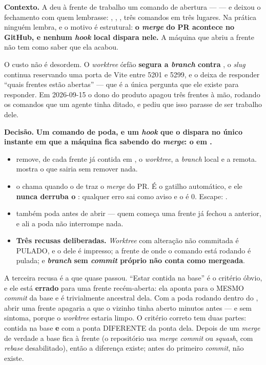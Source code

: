 \textbf{Contexto.} A  deu à frente de trabalho um comando de
abertura ---  --- e deixou o fechamento com quem
lembrasse: , , , três comandos em três lugares. Na prática ninguém lembra, e o motivo
é estrutural: \textbf{o \emph{merge} do PR acontece no GitHub, e nenhum
\emph{hook} local dispara nele.} A máquina que abriu a frente não tem como saber que ela
acabou.

O custo não é desordem. O \emph{worktree} órfão \textbf{segura a \emph{branch}
contra }, o \emph{slug} continua reservando uma porta de Vite entre
5201 e 5299, e o  deixa de responder \enquote{quais
frentes estão abertas} --- que é a única pergunta que ele existe para responder.
Em 2026-09-15 o dono do produto apagou três frentes à mão, rodando os comandos
que um agente tinha ditado, e pediu que isso parasse de ser trabalho dele.

\textbf{Decisão.} \textbf{Um comando de poda, e um \emph{hook} que o dispara no
único instante em que a máquina fica sabendo do \emph{merge}: o 
em .}

\begin{itemize}
  \item {} remove, de cada frente já contida em
    , o \emph{worktree}, a \emph{branch} local e a remota.
     mostra o que sairia sem remover nada.
  \item {} o chama quando o  de
     traz o \emph{merge} do PR. É o gatilho automático, e ele
    \textbf{nunca derruba o }: qualquer erro sai como aviso e o
     é 0. Escape: .
  \item {} também poda antes de abrir --- quem começa uma
    frente já fechou a anterior, e ali a poda não interrompe nada.
  \item \textbf{Três recusas deliberadas.} \emph{Worktree} com alteração não
    commitada é PULADO, e o  dele é impresso; a frente de onde o
    comando está rodando é pulada; e \textbf{\emph{branch} sem \emph{commit}
    próprio não conta como mergeada}.
\end{itemize}

A terceira recusa é a que quase passou. \enquote{Estar contida na base} é o
critério óbvio, e ele está \textbf{errado} para uma frente recém-aberta: ela
aponta para o MESMO \emph{commit} da base e é trivialmente ancestral dela. Com a
poda rodando dentro do , abrir uma frente apagaria a que o vizinho
tinha aberto minutos antes --- e sem sintoma, porque o \emph{worktree} estaria
limpo. O critério correto tem duas partes: contida na base \textbf{e} com a
ponta DIFERENTE da ponta dela. Depois de um \emph{merge} de verdade a base fica
à frente (o repositório usa \emph{merge commit} ou \emph{squash}, com
\emph{rebase} desabilitado), então a diferença existe; antes do primeiro
\emph{commit}, não existe.

